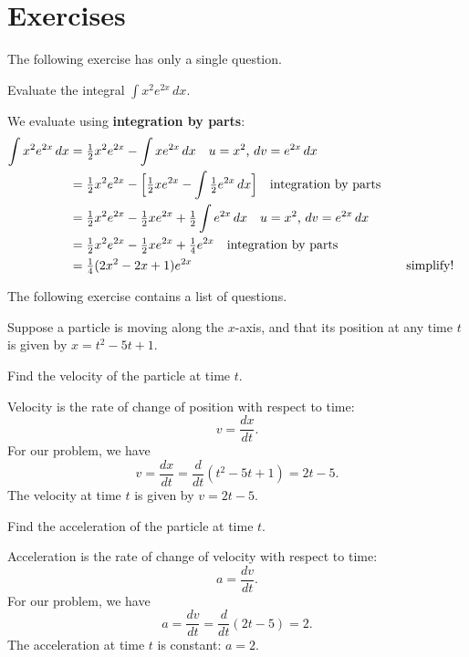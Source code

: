 
\chapter{Exercises}\label{ch:exercises}

The following exercise has only a single question.
\begin{exercise}
Evaluate the integral \(\displaystyle\int x^2 e^{2x}\,dx\).
\begin{answer}
We evaluate using \textbf{integration by parts}:
\begin{align}
 \int x^2 e^{2x}\,dx 
 	&    = \tfrac12 x^2 e^{2x} - \int x e^{2x}\,dx \quad
         \text{$u=x^2$, $dv=e^{2x}\,dx$}\\
	& = \tfrac12 x^2 e^{2x} -
           \Bigl[\tfrac12 x e^{2x}-\int \tfrac12 e^{2x}\,dx\Bigr] \quad
           \text{integration by parts}\\
	& = \tfrac12 x^2 e^{2x} - \tfrac12 x e^{2x} + \tfrac12\int e^{2x}\,dx \quad
           \text{$u=x^2$, $dv=e^{2x}\,dx$}\\
	& = \tfrac12 x^2 e^{2x} - \tfrac12 x e^{2x} + \tfrac14 e^{2x} \quad
           \text{integration by parts}\\ 
	& = \tfrac14(2x^2-2x+1)e^{2x} && \quad
           \text{simplify!}
\end{align}
\end{answer}
\end{exercise}

The following exercise contains a list of questions.
\begin{exercise}\label{ex:newton}
Suppose a particle is moving along the $x$-axis, and that its position
at any time $t$ is given by $x=t^2 - 5t + 1$.
\begin{questions}
\question
Find the velocity of the particle at time $t$.
\begin{answer}
Velocity is the rate of change of position with respect to time:
\[
                    v = \frac{dx}{dt}.
\]
For our problem, we have
\[
        v = \frac{dx}{dt} =\frac d{dt}(t^2 - 5t + 1) = 2t-5.
\]
The velocity at time $t$ is given by $\boxed{v=2t-5}$.
\end{answer}
\question
Find the acceleration of the particle at time $t$.
\begin{answer}
Acceleration is the rate of change of velocity with respect to time:
\[
a = \frac{dv}{dt}.
\]
For our problem, we have
\[
a = \frac{dv}{dt} =\frac d{dt}(2t-5)=2.
\]
The acceleration at time $t$ is constant: $\boxed{a=2}$.
\end{answer}
\end{questions}
\end{exercise}

